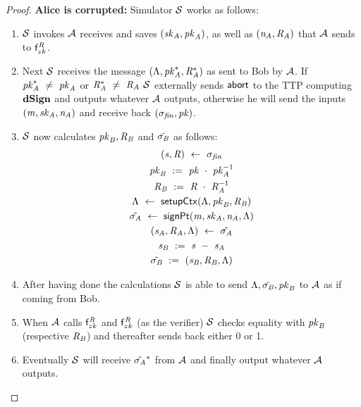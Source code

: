\begin{proof}
    \textbf{Alice is corrupted: } Simulator $\mathcal{S}$ works as follows:
    \begin{enumerate}
        \item $\mathcal{S}$ invokes $\mathcal{A}$ receives and saves $(\mathit{sk}_{\mathit{A}}, \mathit{pk}_{\mathit{A}})$, as well as $(\mathit{\mathit{n}_{\mathit{A}}}, \mathit{R}_{\mathit{A}})$ that $\mathcal{A}$ sends to $\mathsf{f}^{\mathit{R}}_{zk}$.
        \item Next $\mathcal{S}$ receives the message $(\Lambda, \mathit{pk}_{\mathit{A}}^*, \mathit{R}_{\mathit{A}}^*)$ as sent to Bob by $\mathcal{A}$.
        If $\mathit{pk}_{\mathit{A}}^* ~\neq~ \mathit{pk}_{\mathit{A}}$ or $\mathit{R}_{\mathit{A}}^* ~\neq~ \mathit{R}_{\mathit{A}}$ $\mathcal{S}$ externally sends $\mathsf{abort}$ to the TTP computing $\mathbf{dSign}$ and outputs whatever $\mathcal{A}$ outputs, otherwise he will send the inputs $(\mathit{m}, \mathit{sk}_{\mathit{A}}, \mathit{\mathit{n}_{\mathit{A}}})$ and receive back $(\sigma_{\mathit{fin}}, \mathit{pk})$.
        \item $\mathcal{S}$ now calculates $\mathit{pk}_{\mathit{B}}, \mathit{R}_{\mathit{B}}$ and $\tilde{\sigma_{\mathit{B}}}$ as follows:
        \begin{gather*}
            (\mathit{s}, \mathit{R}) ~\leftarrow~ \sigma_{\mathit{fin}} \\
            \mathit{pk}_{\mathit{B}} ~:=~ \mathit{pk} ~\cdot~ \mathit{pk}_{\mathit{A}}^{-1} \\
            \mathit{R}_{\mathit{B}} ~:=~ \mathit{R} ~\cdot~ \mathit{R}_{\mathit{A}}^{-1} \\
            \Lambda ~\leftarrow~ \mathsf{setupCtx}( \Lambda, \mathit{pk}_{\mathit{B}}, \mathit{R}_{\mathit{B}} ) \\
            \tilde{\sigma_{\mathit{A}}} ~\leftarrow~ \mathsf{signPt}(\mathit{m}, \mathit{sk}_{\mathit{A}}, \mathit{\mathit{n}_{\mathit{A}}}, \Lambda) \\
            (\mathit{s}_{\mathit{A}}, \mathit{R}_{\mathit{A}}, \Lambda) ~\leftarrow~ \tilde{\sigma_{\mathit{A}}} \\
            \mathit{s}_{\mathit{B}} ~:=~ \mathit{s} ~-~ \mathit{s}_{\mathit{A}} \\
            \tilde{\sigma_{\mathit{B}}} ~:=~ (\mathit{s}_{\mathit{B}}, \mathit{R}_{\mathit{B}}, \Lambda)
        \end{gather*}
        \item After having done the calculations $\mathcal{S}$ is able to send $\Lambda, \tilde{\sigma_{\mathit{B}}}, \mathit{pk}_{\mathit{B}}$ to $\mathcal{A}$ as if coming from Bob.
        \item When $\mathcal{A}$ calls $\mathsf{f}^{\mathit{R}}_{zk}$ and $\mathsf{f}^{\mathit{R}}_{zk}$ (as the verifier) $\mathcal{S}$ checks equality with $\mathit{pk}_{\mathit{B}}$ (respective $\mathit{R}_{\mathit{B}}$) and thereafter sends back either 0 or 1.
        \item Eventually $\mathcal{S}$ will receive $\tilde{\sigma_{\mathit{A}}}^*$ from $\mathcal{A}$ and finally output whatever $\mathcal{A}$ outputs.
    \end{enumerate}


\end{proof}
